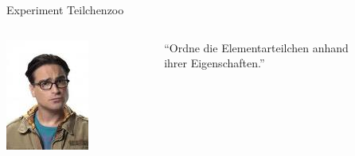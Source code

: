 \documentclass{beamer}
\begin{document}
\begin{frame}
  \begin{center}
    {\Huge Experiment Teilchenzoo}
  \end{center}
   \begin{block}{}
     \begin{columns}
       \begin{column}{0.3\textwidth}
         \centering
         \includegraphics[height=0.3\textheight]{eyecandy/Lennard}
       \end{column}
       \begin{column}{0.7\textwidth}
         \alert{``Ordne die Elementarteilchen anhand\\ ihrer Eigenschaften.''}
       \end{column}
     \end{columns}
   \end{block}
\end{frame}
\end{document}
